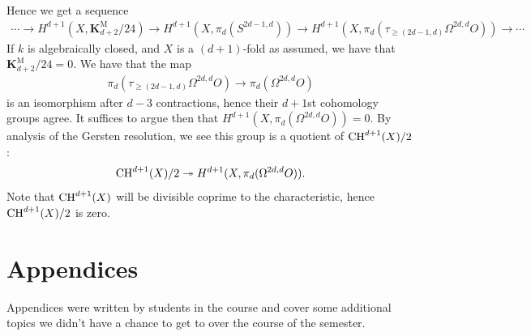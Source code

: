 \documentclass[11pt,openany]{book}
\providecommand{\KM}{\mathbf{K}^\mathrm{M}}
\begin{document}
Hence we get a sequence
\begin{align*}
    \cdots \to H^{d+1}(X,\KM_{d+2}/24) \to H^{d+1}(X, \pi_d(S^{2d-1,d})) \to H^{d+1}(X, \pi_d(\tau_{\ge(2d-1,d)}\Omega^{2d,d}O)) \to \cdots 
\end{align*}
If $k$ is algebraically closed, and $X$ is a $(d+1)$-fold as assumed, we have that $\KM_{d+2}/24 = 0$. We have that the map
\begin{align*}
    \pi_d(\tau_{\ge(2d-1,d)}\Omega^{2d,d}O) \to \pi_d(\Omega^{2d,d}O)
\end{align*}
is an isomorphism after $d-3$ contractions, hence their $d+1$st cohomology groups agree. It suffices to argue then that $H^{d+1}(X,\pi_d(\Omega^{2d,d}O)) = 0$. By analysis of the Gersten resolution, we see this group is a quotient of $\mathrm{CH}^{d+1}(X)/2$:
\begin{align*}
    \mathrm{CH}^{d+1}(X)/2 \twoheadrightarrow H^{d+1}(X, \pi_d(\Omega^{2d,d}O)).
\end{align*}
Note that $\mathrm{CH}^{d+1}(X)$ will be divisible coprime to the characteristic, hence $\mathrm{CH}^{d+1}(X)/2$ is zero.


\chapter{Appendices}
Appendices were written by students in the course and cover some additional topics we didn't have a chance to get to over the course of the semester.








\end{document}

